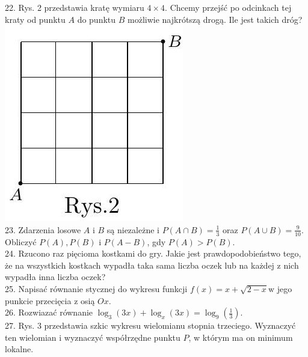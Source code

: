 \documentclass[10pt]{article}
\begin{document}
22. Rys. 2 przedstawia kratę wymiaru \(4 \times 4\). Chcemy przejść po odcinkach tej kraty od punktu \(A\) do punktu \(B\) możliwie najkrótszą drogą. Ile jest takich dróg?\\
\includegraphics[max width=\textwidth, center]{2024_11_21_7f9effa233da5317fab2g-2}\\
23. Zdarzenia losowe \(A\) i \(B\) są niezależne i \(P(A \cap B)=\frac{1}{3}\) oraz \(P(A \cup B)=\frac{9}{10}\). Obliczyć \(P(A), P(B)\) i \(P(A-B)\), gdy \(P(A)>P(B)\).\\
24. Rzucono raz pięcioma kostkami do gry. Jakie jest prawdopodobieństwo tego, że na wszystkich kostkach wypadła taka sama liczba oczek lub na każdej z nich wypadła inna liczba oczek?\\
25. Napisać równanie stycznej do wykresu funkcji \(f(x)=x+\sqrt{2-x} \mathrm{w}\) jego punkcie przecięcia z osią \(O x\).\\
26. Rozwiazać równanie \(\log _{3}(3 x)+\log _{x}(3 x)=\log _{9}\left(\frac{1}{3}\right)\).\\
27. Rys. 3 przedstawia szkic wykresu wielomianu stopnia trzeciego. Wyznaczyć ten wielomian i wyznaczyć współrzędne punktu \(P\), w którym ma on minimum lokalne.\\
\end{document}
